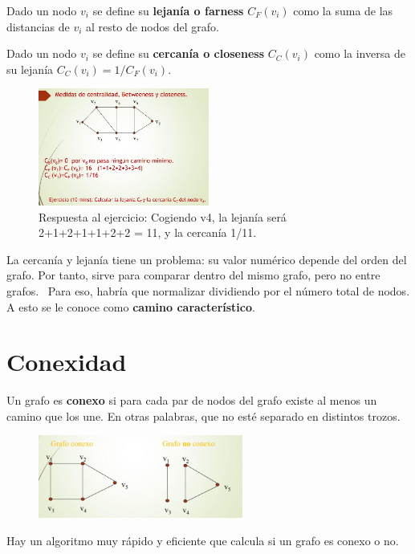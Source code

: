 Dado un nodo $v_i$ se define su \textbf{lejanía o farness} $C_F (v_i)$ como la suma de las distancias de $v_i$ al resto de nodos del grafo. 

Dado un nodo $v_i$ se define su \textbf{cercanía o closeness} $C_C (v_i)$ como la inversa de su lejanía $C_C (v_i) = 1/C_F (v_i)$.

\begin{figure}[h]
\centering
\includegraphics[width = 0.5\textwidth]{figs/medidas-centralidad.png}
\caption{Respuesta al ejercicio: Cogiendo v4, la lejanía será 2+1+2+1+1+2+2 = 11, y la cercanía 1/11.}
\end{figure}

La cercanía y lejanía tiene un problema: su valor numérico depende del orden del grafo. Por tanto, sirve para comparar dentro del mismo grafo, pero no entre grafos. 
 \
Para eso, habría que normalizar dividiendo por el número total de nodos. A esto se le conoce como \textbf{camino característico}.

\section{Conexidad}
Un grafo es \textbf{conexo} si para cada par de nodos del grafo existe al menos un camino que los une. En otras palabras, que no esté separado en distintos trozos. 

\begin{figure}[h]
\centering
\includegraphics[width = 0.6\textwidth]{figs/conexidad.png}
\end{figure}

Hay un algoritmo muy rápido y eficiente que calcula si un grafo es conexo o no. 

